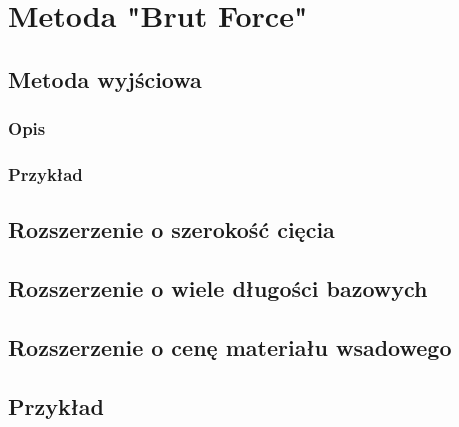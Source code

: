 \section{Metoda "Brut Force"}
\subsection{Metoda wyjściowa}
\subsubsection{Opis}
\subsubsection{Przykład}
\subsection{Rozszerzenie o szerokość cięcia}
\subsection{Rozszerzenie o wiele długości bazowych}
\subsection{Rozszerzenie o cenę materiału wsadowego}
\subsection{Przykład}
